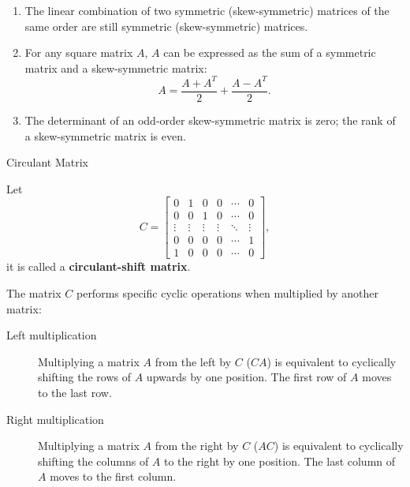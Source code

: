 \documentclass[11pt]{../../TexTemplate/elegantbook} %
\begin{document}
\begin{property}
    \begin{enumerate}
        \item The linear combination of two symmetric (skew-symmetric) matrices of the same order 
            are still symmetric (skew-symmetric) matrices. 
        \item For any square matrix \(A\), \(A\) can be expressed as the sum of 
            a symmetric matrix and a skew-symmetric matrix:
            \[
            A = \frac{A + A^T}{2} + \frac{A - A^T}{2}.
            \]
        \item The determinant of an odd-order skew-symmetric matrix is zero; 
            the rank of a skew-symmetric matrix is even. 
    \end{enumerate}
\end{property}


\begin{leftbarTitle}{Circulant Matrix}\end{leftbarTitle}
Let 
\[
C = 
\begin{bmatrix} 
    0 & 1 & 0 & 0 & \cdots & 0 \\ 
    0 & 0 & 1 & 0 & \cdots & 0 \\ 
    \vdots & \vdots & \vdots & \vdots & \ddots & \vdots \\ 
    0 & 0 & 0 & 0 & \cdots & 1 \\
    1 & 0 & 0 & 0 & \cdots & 0
\end{bmatrix},
\]
it is called a \textbf{circulant-shift matrix}.

The matrix \(C\) performs specific cyclic operations when multiplied by another matrix:
\begin{description}
    \item [Left multiplication] Multiplying a matrix \(A\) from the left by \(C\) (\(CA\)) 
        is equivalent to cyclically shifting the rows of \(A\) upwards by one position. 
        The first row of \(A\) moves to the last row.
    \item [Right multiplication] Multiplying a matrix \(A\) from the right by \(C\) (\(AC\)) 
        is equivalent to cyclically shifting the columns of \(A\) to the right by one position. 
        The last column of \(A\) moves to the first column.
\end{description}
\end{document}
